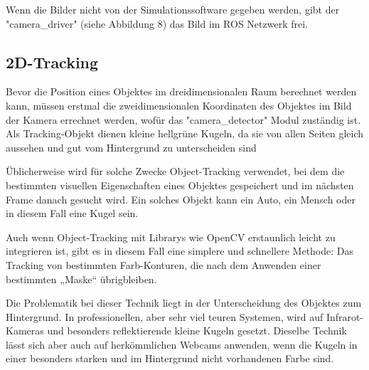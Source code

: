 \documentclass[12pt, ngerman]{article}
\begin{document}
Wenn die Bilder nicht von der Simulationssoftware gegeben werden, gibt der "camera\_driver" (siehe Abbildung 8) das Bild im ROS Netzwerk frei.

\subsection{2D-Tracking}
Bevor die Position eines Objektes im dreidimensionalen Raum berechnet werden kann, müssen erstmal die zweidimensionalen Koordinaten des Objektes im Bild der Kamera errechnet werden, wofür das "camera\_detector" Modul zuständig ist. Als Tracking-Objekt dienen kleine hellgrüne Kugeln, da sie von allen Seiten gleich aussehen und gut vom Hintergrund zu unterscheiden sind  

Üblicherweise wird für solche Zwecke Object-Tracking verwendet, bei dem die bestimmten visuellen Eigenschaften eines Objektes gespeichert und im nächsten Frame danach gesucht wird. Ein solches Objekt kann ein Auto, ein Mensch oder in diesem Fall eine Kugel sein.  

Auch wenn Object-Tracking mit Librarys wie OpenCV erstaunlich leicht zu integrieren ist, gibt es in diesem Fall eine simplere und schnellere Methode: Das Tracking von bestimmten Farb-Konturen, die nach dem Anwenden einer bestimmten „Maske“ übrigbleiben. 

Die Problematik bei dieser Technik liegt in der Unterscheidung des Objektes zum Hintergrund. In professionellen, aber sehr viel teuren Systemen, wird auf Infrarot-Kameras und besonders reflektierende kleine Kugeln gesetzt. Dieselbe Technik lässt sich aber auch auf herkömmlichen Webcams anwenden, wenn die Kugeln in einer besonders starken und im Hintergrund nicht vorhandenen Farbe sind. 
\end{document}
